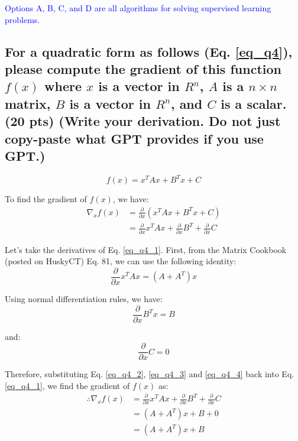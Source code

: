 \textcolor{blue}{Options A, B, C, and D are all algorithms for solving supervised learning problems.}

\subsection{For a quadratic form as follows (Eq. \ref{eq_q4}), please compute the gradient of this function $f(x)$ where $x$ is a vector in $R^n$, $A$ is a $n \times n$ matrix, $B$ is a vector in $R^n$, and $C$ is a scalar. (20 pts) (Write your derivation. Do not just copy-paste what GPT provides if you use GPT.)}

\begin{equation}
    f(x) = x^T A x + B^T x + C
    \label{eq_q4}
\end{equation}

To find the gradient of $f(x)$, we have:
\begin{align}
    \nabla_x f(x) &= \frac{\partial}{\partial x} (x^T A x + B^T x + C) \nonumber \\
    &= \frac{\partial}{\partial x} x^T A x + \frac{\partial}{\partial x} B^T + \frac{\partial}{\partial x} C
    \label{eq_q4_1}
\end{align} 

Let's take the derivatives of Eq. \ref{eq_q4_1}. First, from the Matrix Cookbook (posted on HuskyCT) Eq. 81, we can use the following identity:
\begin{equation}
    \frac{\partial}{\partial x} x^T A x = (A + A^T) x  
    \label{eq_q4_2}
\end{equation}

Using normal differentiation rules, we have:
\begin{equation}
    \frac{\partial}{\partial x} B^T x = B  
    \label{eq_q4_3}
\end{equation}

and: 
\begin{equation}
    \frac{\partial}{\partial x} C = 0  
    \label{eq_q4_4}
\end{equation}

Therefore, substituting Eq. \ref{eq_q4_2}, \ref{eq_q4_3} and \ref{eq_q4_4} back into Eq. \ref{eq_q4_1}, we find the gradient of $f(x)$ as:
\begin{align}
    \therefore \nabla_x f(x) &= \frac{\partial}{\partial x} x^T A x + \frac{\partial}{\partial x} B^T + \frac{\partial}{\partial x} C \nonumber \\
    &= (A + A^T) x + B + 0 \nonumber \\
    &= (A + A^T) x + B
    \label{eq_q4_5}
\end{align} 

